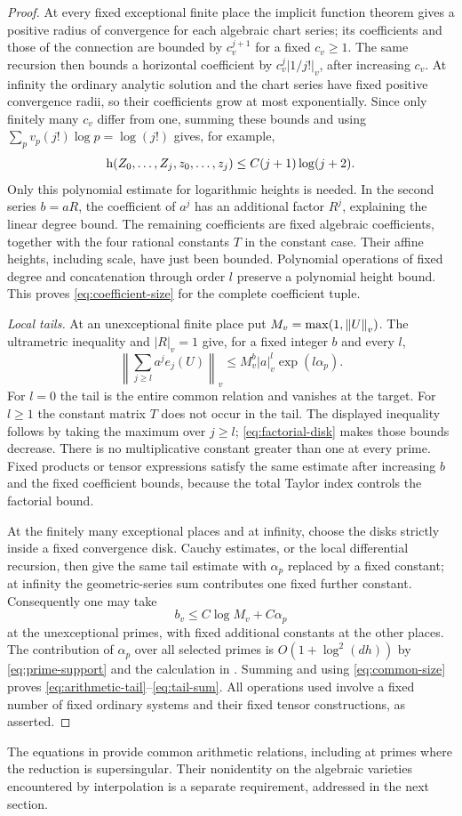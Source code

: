 \begin{proof}
At every fixed exceptional finite place the implicit
function theorem gives a positive radius of convergence
for each algebraic chart series; its coefficients and
those of the connection are bounded by $c_v^{j+1}$ for
a fixed $c_v\ge1$.  The same recursion then bounds a
horizontal coefficient by $c_v^j|1/j!|_v$, after increasing
$c_v$.  At infinity the ordinary analytic solution and
the chart series have fixed positive convergence radii,
so their coefficients grow at most exponentially.
Since only finitely many $c_v$ differ from one, summing
these bounds and using
$\sum_{p}v_p(j!)\log p=\log(j!)$ gives, for example,
\[
 \mathrm h\!\left(Z_0,\ldots,Z_j,z_0,\ldots,z_j\right)
       \le C(j+1)\log(j+2).
\]
Only this polynomial estimate for logarithmic heights is
needed.  In the second series $b=aR$, the coefficient of
$a^j$ has an additional factor $R^j$, explaining the
linear degree bound.  The remaining coefficients are
fixed algebraic coefficients, together with the four
rational constants $T$ in the constant case.  Their
affine heights, including scale, have just been bounded.
Polynomial operations of fixed degree and concatenation through order
$l$ preserve a polynomial height bound.  This proves
\eqref{eq:coefficient-size} for the complete coefficient tuple.

\emph{Local tails.}
At an unexceptional finite place put
$M_v=\max(1,\left\lVert U\right\rVert_v)$.  The ultrametric inequality
and $|R|_v=1$ give, for a fixed integer $b$ and every $l$,
\[
 \left\|\sum_{j\ge l}a^j e_j(U)\right\|_v
       \le M_v^b |a|_v^l\exp(l\alpha_p).
\]
For $l=0$ the tail is the entire common relation and
vanishes at the target.  For $l\ge1$ the constant matrix
$T$ does not occur in the tail.
The displayed inequality follows by taking the maximum
over $j\ge l$; \eqref{eq:factorial-disk} makes those
bounds decrease.  There is no multiplicative constant
greater than one at every prime.  Fixed products or
tensor expressions satisfy the same estimate after
increasing $b$ and the fixed coefficient bounds, because
the total Taylor index controls the factorial bound.

At the finitely many exceptional places and at infinity,
choose the disks strictly inside a fixed convergence
disk.  Cauchy estimates, or the local differential
recursion, then give the same tail estimate with
$\alpha_p$ replaced by a fixed constant; at infinity
the geometric-series sum contributes one fixed further
constant.  Consequently one may take
\[
 b_v\le C\log M_v+C\alpha_p
\]
at the unexceptional primes, with fixed additional
constants at the other places.  The contribution of
$\alpha_p$ over all selected primes is
$O(1+\log^2(dh))$ by \eqref{eq:prime-support} and the
calculation in .  Summing and using
\eqref{eq:common-size} proves
\eqref{eq:arithmetic-tail}--\eqref{eq:tail-sum}.
All operations used involve a fixed number of fixed
ordinary systems and their fixed tensor constructions,
as asserted.
\end{proof}

The equations in  provide common
arithmetic relations, including at primes where the reduction is
supersingular.  Their nonidentity on the algebraic varieties
encountered by interpolation is a separate requirement, addressed
in the next section.
